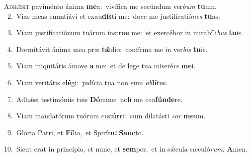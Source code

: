 \lettrine{\initial\textcolor{\initialcolor}{A}}{dhǽsit} paviménto ánima \textbf{me}\-a:~\star vivífica me secúndum ver\textit{bum} \textbf{tu}\-um.\\
{\numbfont\textcolor{\numbcolor}{~2.}}~Vias meas enuntiávi et exau\-\textbf{dís}\-ti me:~\star doce me justificatió\textit{nes} \textbf{tu}\-as.\par
{\numbfont\textcolor{\numbcolor}{~3.}}~Viam justificatiónum tuárum ínstru\textbf{e} me:~\star et exercébor in mirabíli\textit{bus} \textbf{tu}\-is.\par
{\numbfont\textcolor{\numbcolor}{~4.}}~Dormitávit ánima mea præ \textbf{tǽ}\-dio:~\star confírma me in ver\textit{bis} \textbf{tu}\-is.\par
{\numbfont\textcolor{\numbcolor}{~5.}}~Viam iniquitátis ámove \textbf{a} me:~\star et de lege tua miseré\textit{re} \textbf{me}\-i.\par
{\numbfont\textcolor{\numbcolor}{~6.}}~Viam veritátis e\-\textbf{lé}\-gi:~\star judícia tua non sum \textit{ob}\-\textbf{lí}tus.\par
{\numbfont\textcolor{\numbcolor}{~7.}}~Adhǽsi testimóniis tuis \textbf{Dó}\-mine:~\star noli me \textit{con}\-\textbf{fún}\textbf{de}re.\par
{\numbfont\textcolor{\numbcolor}{~8.}}~Viam mandatórum tuórum cu\-\textbf{cúr}\-ri:~\star cum dilatásti \textit{cor} \textbf{me}\-um.\par
{\numbfont\textcolor{\numbcolor}{~9.}}~Glória Patri, et \textbf{Fí}\-lio,~\star et Spirítu\textit{i} \textbf{Sanc}\-to.\par
{\numbfont\textcolor{\numbcolor}{10.}}~Sicut erat in princípio, et nunc, et \textbf{sem}\-per,~\star et in sǽcula sæculó\-\textit{rum}\-. \textbf{A}\-men.\par
